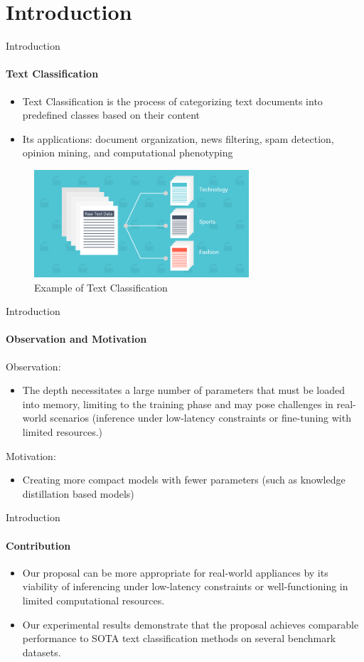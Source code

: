 \section{Introduction}
\begin{frame}{Introduction}
\framesubtitle{Text Classification}
\begin{itemize}
\item Text Classification is the process of categorizing text documents into predefined classes based on their content
\item Its applications: document organization, news filtering, spam detection, opinion mining, and computational phenotyping
\end{itemize}

\begin{figure}
\centering
\includegraphics[width=80mm,scale=0.7]{img/TC_example.png}
\caption{Example of Text Classification}
\label{fig:example}
\end{figure}
\end{frame}

\begin{frame}{Introduction}
\framesubtitle{Observation and Motivation}
Observation:
\begin{itemize}
\item The depth necessitates a large number of parameters that must be loaded into memory, limiting to the training phase and may pose challenges in real-world scenarios (inference under low-latency constraints or fine-tuning with limited resources.)
\end{itemize}

Motivation: 
\begin{itemize}
\item Creating more compact models with fewer parameters (such as knowledge distillation based models)
\end{itemize}
\end{frame}

\begin{frame}{Introduction}
\framesubtitle{Contribution}
\begin{itemize}
\item Our proposal can be more appropriate for real-world appliances by its viability of inferencing under low-latency constraints or well-functioning in limited computational resources.
\item Our experimental results demonstrate that the proposal achieves comparable performance to SOTA text classification methods on several benchmark datasets.
\end{itemize}
    
\end{frame}